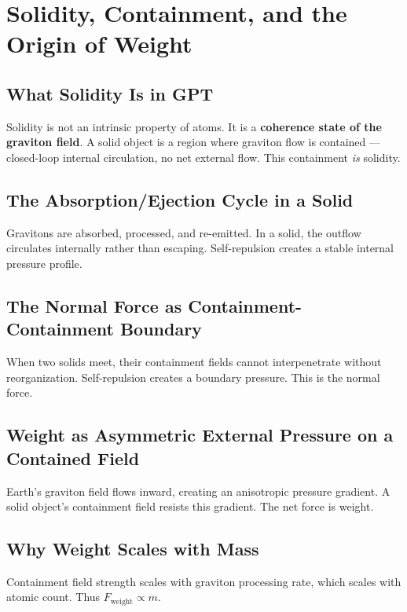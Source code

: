 \documentclass[12pt, a4paper]{article}
\begin{document}
\section{Solidity, Containment, and the Origin of Weight}

\subsection{What Solidity Is in GPT}

Solidity is not an intrinsic property of atoms. It is a \textbf{coherence state of the graviton field}. A solid object is a region where graviton flow is contained — closed-loop internal circulation, no net external flow. This containment \textit{is} solidity.

\subsection{The Absorption/Ejection Cycle in a Solid}

Gravitons are absorbed, processed, and re-emitted. In a solid, the outflow circulates internally rather than escaping. Self-repulsion creates a stable internal pressure profile.

\subsection{The Normal Force as Containment-Containment Boundary}

When two solids meet, their containment fields cannot interpenetrate without reorganization. Self-repulsion creates a boundary pressure. This is the normal force.

\subsection{Weight as Asymmetric External Pressure on a Contained Field}

Earth's graviton field flows inward, creating an anisotropic pressure gradient. A solid object's containment field resists this gradient. The net force is weight.

\subsection{Why Weight Scales with Mass}

Containment field strength scales with graviton processing rate, which scales with atomic count. Thus \( F_{\text{weight}} \propto m \).
\end{document}
